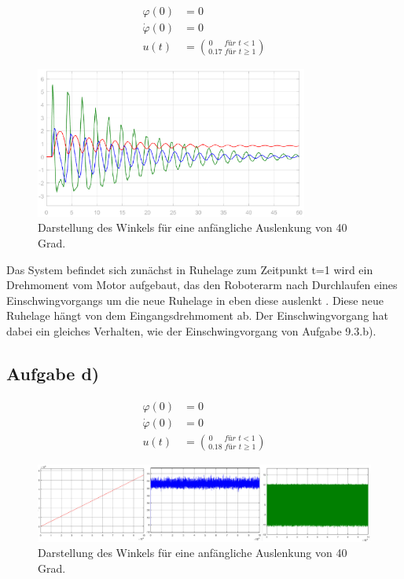 \documentclass[10pt]{scrartcl}
\begin{document}
\begin{align}
\varphi  (0) &= 0 \\
\dot \varphi (0) &= 0 \\
u(t)  &= \binom{0\,\,\,\,\,\,\,\,\, für\,\, t<1}{0.17\,\, für\,\, t \geq 1}
\end{align}
\begin{figure}[H]
	\centering
	\includegraphics[width=0.8\textwidth]{9c}
	\caption{Darstellung des Winkels für eine anfängliche Auslenkung von 40 Grad. }
	\label{img:grafik-dummy}
\end{figure}
Das System befindet sich zunächst in Ruhelage
zum Zeitpunkt t=1 wird ein Drehmoment vom Motor aufgebaut,
das den Roboterarm nach Durchlaufen eines Einschwingvorgangs 
um die neue Ruhelage in eben diese auslenkt . Diese neue Ruhelage hängt von dem Eingangsdrehmoment ab. Der Einschwingvorgang hat dabei ein gleiches Verhalten, wie der Einschwingvorgang von Aufgabe 9.3.b). 


%






\subsection{Aufgabe d)}
\begin{align}
\varphi  (0) &= 0 \\
\dot \varphi (0) &= 0 \\
u(t)  &= \binom{0\,\,\,\,\,\,\,\,\, für\,\, t<1}{0.18\,\, für\,\, t \geq 1}
\end{align}
\begin{figure}[H]
	\centering
	\includegraphics[width=1.2\textwidth]{Theoretischer Teil/Aufgabe9c.png}
	\caption{Darstellung des Winkels für eine anfängliche Auslenkung von 40 Grad. }
	\label{img:grafik-dummy}
\end{figure}
\end{document}
